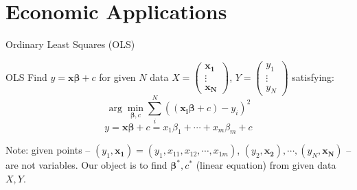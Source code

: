 \documentclass[final]{beamer}
\newcommand{\bd}{\mathbf}
\begin{document}
\section{Economic Applications} %
\label{sec:economic_applications}
\begin{frame}[t]{Ordinary Least Squares (OLS)}
	\begin{block}
		{OLS}
		Find $y=\bd{x}\bd{\beta}+{c}$ for given $N$ data $X = \begin{pmatrix}
			\bd{x_1}\\
			\vdots\\
			\bd{x_N}
		\end{pmatrix}$, $Y=\begin{pmatrix}
			y_1\\
			\vdots\\
			y_N
		\end{pmatrix}$ satisfying:
		\[
			\arg\min_{\bd{\beta},{c}} \sum_i^N ((\bd{x_i}\bd{\beta}+{c})-y_i)^2 \tag{Least Square}
		\]\[
			y=\bd{x}\bd{\beta}+{c} = x_1 \beta_1 + \cdots + x_m \beta_m + {c}
		\]%
	\end{block}
	Note: given points -- $(y_1, \bd{x_1}) = (y_1, x_{11},x_{12},\cdots,x_{1m})$, $(y_2,\bd{x_2}), \cdots , (y_N,\bd{x_N})$ -- are not variables. Our object is to find $\bd{\beta^\ast}, {c^\ast}$ (linear equation) from given data $X,Y$.
\end{frame}
\end{document}
